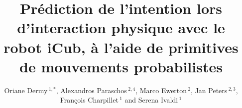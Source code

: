 \documentclass[utf8]{frontiersSCNS} %
\def\firstAuthorLast{Dermy {et~al.}} %
\def\Authors{Oriane Dermy\,$^{1,*}$, Alexandros Paraschos\,$^{2,4}$, Marco Ewerton\,$^{2}$,  Jan Peters\,$^{2,3}$, Fran\c cois Charpillet\,$^{1}$ and Serena Ivaldi\,$^{1}$}
\begin{document}
\onecolumn
{}

\title[Prédiction de l'intention lors d'interaction avec le robot iCub]{Prédiction de l'intention lors d'interaction physique avec le robot iCub, à l'aide de primitives de mouvements probabilistes} 

\author[\firstAuthorLast ]{\Authors} %
\address{} %
\correspondance{} %

\extraAuth{}%
\end{document}
